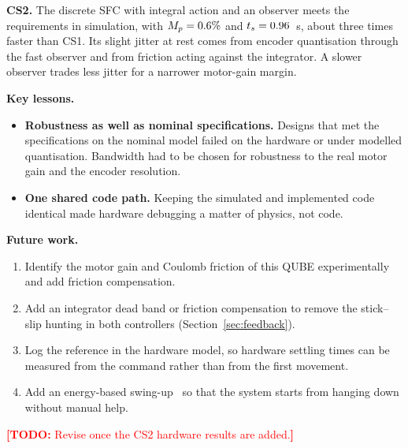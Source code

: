 \documentclass[11pt,a4paper]{article}
\newcommand{\todo}[1]{\textcolor{red}{\textbf{[TODO:} #1\textbf{]}}}
\begin{document}
\textbf{CS2.} The discrete SFC with integral action and an observer meets
the requirements in simulation, with $M_p=0.6\%$ and
$t_s=0.96$~s, about three times faster than CS1. Its slight jitter at
rest comes from encoder quantisation through the fast observer and from
friction acting against the integrator. A slower observer trades less
jitter for a narrower motor-gain margin.

\textbf{Key lessons.}
\begin{itemize}[nosep]
\item \textbf{Robustness as well as nominal specifications.} Designs that
  met the specifications on the nominal model failed on the hardware or
  under modelled quantisation. Bandwidth had to be chosen for robustness
  to the real motor gain and the encoder resolution.
\item \textbf{One shared code path.} Keeping the simulated and
  implemented code identical made hardware debugging a matter of
  physics, not code.
\end{itemize}

\textbf{Future work.}
\begin{enumerate}[nosep]
\item Identify the motor gain and Coulomb friction of this QUBE
  experimentally and add friction compensation.
\item Add an integrator dead band or friction compensation to remove
  the stick--slip hunting in both controllers (Section~\ref{sec:feedback}).
\item Log the reference in the hardware model, so hardware settling times
  can be measured from the command rather than from the first movement.
\item Add an energy-based swing-up~\cite{astrom2000} so that the system
  starts from hanging down without manual help.
\end{enumerate}
\todo{Revise once the CS2 hardware results are added.}
\end{document}
